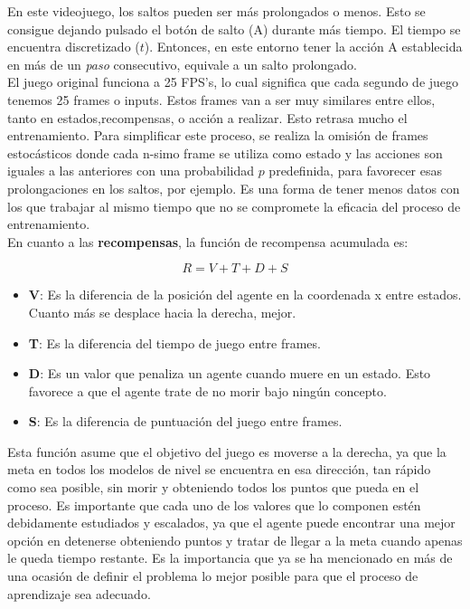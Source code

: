 \documentclass[11pt,fleqn]{book} %
\begin{document}
En este videojuego, los saltos pueden ser más prolongados o menos. Esto se consigue dejando pulsado el botón de salto (A) durante más tiempo. El tiempo se encuentra discretizado ($t$). Entonces, en este entorno tener la acción A establecida en más de un \textit{paso} consecutivo, equivale a un salto prolongado. \\

El juego original funciona a 25 FPS's, lo cual significa que cada segundo de juego tenemos 25 frames o inputs. Estos frames van a ser muy similares entre ellos, tanto en estados,recompensas, o acción a realizar. Esto retrasa mucho el entrenamiento. Para simplificar este proceso, se realiza la omisión de frames estocásticos donde cada n-simo frame se utiliza como estado y las acciones son iguales a las anteriores con una probabilidad $p$ predefinida, para favorecer esas prolongaciones en los saltos, por ejemplo. Es una forma de tener menos datos con los que trabajar al mismo tiempo que no se compromete la eficacia del proceso de entrenamiento.\\

En cuanto a las \textbf{recompensas}, la función de recompensa acumulada es: 

\begin{equation}
R=V+T+D+S
\end{equation}

\begin{itemize}
	\item \textbf{V}: Es la diferencia de la posición del agente en la coordenada x entre estados. Cuanto más se desplace hacia la derecha, mejor. \\
	
	\item \textbf{T}: Es la diferencia del tiempo de juego entre frames. \\
	
	\item \textbf{D}: Es un valor que penaliza un agente cuando muere en un estado. Esto favorece a que el agente trate de no morir bajo ningún concepto. \\
	
	\item \textbf{S}: Es la diferencia de puntuación del juego entre frames. \\
\end{itemize}

Esta función asume que el objetivo del juego es moverse a la derecha, ya que la meta en todos los modelos de nivel se encuentra en esa dirección, tan rápido como sea posible, sin morir y obteniendo todos los puntos que pueda en el proceso. Es importante que cada uno de los valores que lo componen estén debidamente estudiados y escalados, ya que el agente puede encontrar una mejor opción en detenerse obteniendo puntos y tratar de llegar a la meta cuando apenas le queda tiempo restante. Es la importancia que ya se ha mencionado en más de una ocasión de definir el problema lo mejor posible para que el proceso de aprendizaje sea adecuado. \\
\end{document}
